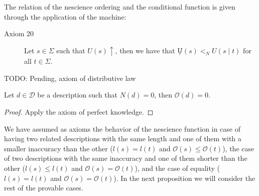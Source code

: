 The relation of the nescience ordering and the conditional function is given through the application of the machine:

\begin{description}
\item[Axiom 20] Let $s \in \Sigma$ such that $U(s) \uparrow$, then we have that $\not U(s) <_N U(s \mid t)$ for all $t \in \Sigma$.
\end{description}

{\color{red} TODO: Pending, axiom of distributive law}

\begin{proposition}
Let $d \in \mathcal{D}$ be a description such that $N(d)=0$, then $\mathcal{O}(d)=0$.
\end{proposition}
\begin{proof}
Apply the axiom of perfect knowledge.
\end{proof}

We have assumed as axioms the behavior of the nescience function in case of having two related descriptions with the same length and one of them with a smaller inaccuracy than the other ($l(s) = l(t)$ and $\mathcal{O} (s) \leq \mathcal{O} (t)$), the case of two descriptions with the same inaccuracy and one of them shorter than the other ($l(s) \leq l(t)$ and $\mathcal{O} (s) = \mathcal{O} (t)$), and the case of equality ($l(s) = l(t)$ and $\mathcal{O} (s) = \mathcal{O} (t)$). In the next proposition we will consider the rest of the provable cases.

